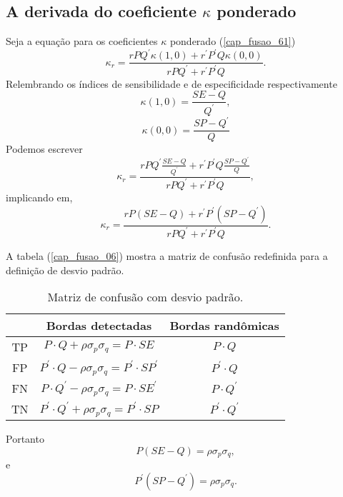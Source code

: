 \subsection{A derivada do coeficiente $\kappa$ ponderado}
Seja a equação para os coeficientes $\kappa$ ponderado (\ref{cap_fusao_61})
\begin{equation}\nonumber
	\kappa_r = \frac{rPQ^{'}\kappa(1,0) +r^{'}P^{'}Q\kappa(0,0)}{rPQ^{'} +r^{'}P^{'}Q}.
\end{equation}
Relembrando os índices de sensibilidade e de especificidade respectivamente
\begin{equation}\nonumber
	\kappa(1,0) = \frac{SE-Q}{Q^{'}},
\end{equation}
\begin{equation}\nonumber
	\kappa(0,0) = \frac{SP-Q^{'}}{Q}
\end{equation}
Podemos escrever 
\begin{equation}\nonumber
	\kappa_r = \frac{rPQ^{'}\frac{SE-Q}{Q^{'}} +r^{'}P^{'}Q\frac{SP-Q^{'}}{Q}}{rPQ^{'} +r^{'}P^{'}Q},
\end{equation}
implicando em,
\begin{equation}\label{cap_fusao_65}
	\kappa_r = \frac{rP(SE-Q) + r^{'}P^{'}(SP-Q^{'})}{rPQ^{'} +r^{'}P^{'}Q}.
\end{equation}

A tabela (\ref{cap_fusao_06}) mostra a matriz de confusão redefinida para a definição de desvio padrão. 
\begin{table}[hbt]
	\centering
	\caption{Matriz de confusão com desvio padrão.}\label{cap_fusao_tab06}
\begin{tabular}{@{}ccc@{}} \toprule
	     & Bordas detectadas  & Bordas randômicas  \\ \midrule
	TP  & $P\cdot Q +\rho \sigma_p\sigma_q=P\cdot SE$         & $P\cdot Q$  \\ 
	FP  & $P^{'}\cdot Q -\rho \sigma_p\sigma_q=P^{'}\cdot SP^{'}$ & $P^{'}\cdot Q$  \\ 
	FN  & $P\cdot Q^{'} -\rho \sigma_p\sigma_q=P    \cdot SE^{'}$ & $P    \cdot Q^{'}$  \\ 
	TN  & $P^{'}\cdot Q^{'} +\rho \sigma_p\sigma_q=P^{'}\cdot SP$     & $P^{'}\cdot Q^{'}$  \\ \bottomrule 
\end{tabular}
\end{table}

Portanto
\begin{equation}\nonumber
	P(SE-Q) = \rho \sigma_p\sigma_q,
\end{equation}
e 
\begin{equation}\nonumber
	P^{'}(SP-Q^{'}) = \rho \sigma_p\sigma_q.
\end{equation}

